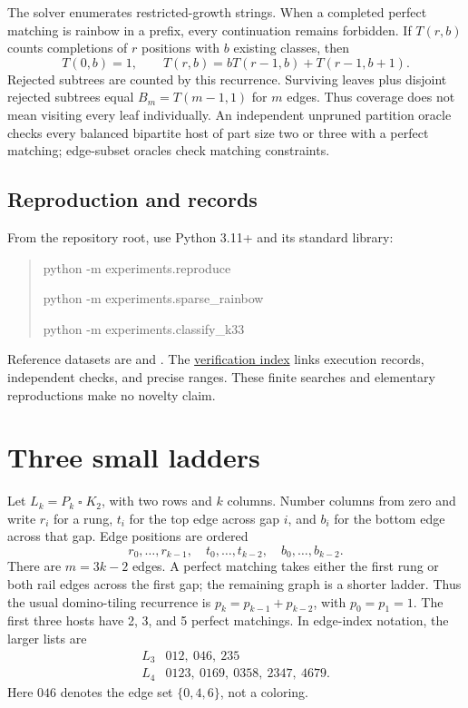 \documentclass[11pt,letterpaper]{article}
\begin{document}
The solver enumerates restricted-growth strings. When a completed perfect
matching is rainbow in a prefix, every continuation remains forbidden.
If $T(r,b)$ counts completions of $r$ positions with $b$ existing classes, then
\[
 T(0,b)=1,\qquad T(r,b)=bT(r-1,b)+T(r-1,b+1).
\]
Rejected subtrees are counted by this recurrence. Surviving leaves plus
disjoint rejected subtrees equal $B_m=T(m-1,1)$ for $m$ edges. Thus coverage
does not mean visiting every leaf individually. An independent unpruned
partition oracle checks every balanced bipartite host of part size two or
three with a perfect matching; edge-subset oracles check matching constraints.

\subsection*{Reproduction and records}
From the repository root, use Python 3.11+ and its standard library:
\begin{quote}\small\ttfamily
python -m experiments.reproduce\par
python -m experiments.sparse\_rainbow\par
python -m experiments.classify\_k33
\end{quote}
Reference datasets are  and
. The
\href{https://github.com/Akhil-rav/discrete-math-lab/blob/main/results/verification_index.md}{verification index}
links execution records, independent checks, and precise ranges. These
finite searches and elementary reproductions make no novelty claim.

\newpage
\section{Three small ladders}
Let $L_k=P_k\mathbin{\square}K_2$, with two rows and $k$ columns. Number columns
from zero and write $r_i$ for a rung, $t_i$ for the top edge across gap $i$,
and $b_i$ for the bottom edge across that gap. Edge positions are ordered
\[
 r_0,\ldots,r_{k-1},\quad
 t_0,\ldots,t_{k-2},\quad b_0,\ldots,b_{k-2}.
\]
There are $m=3k-2$ edges. A perfect matching takes either the first rung
or both rail edges across the first gap; the remaining graph is a shorter
ladder. Thus the usual domino-tiling recurrence is
$p_k=p_{k-1}+p_{k-2}$, with $p_0=p_1=1$. The first three hosts have
2, 3, and 5 perfect matchings. In edge-index notation, the larger lists are
\[
\begin{array}{c|l}
 L_3 & 012,\ 046,\ 235\\
 L_4 & 0123,\ 0169,\ 0358,\ 2347,\ 4679 .
\end{array}
\]
Here $046$ denotes the edge set $\{0,4,6\}$, not a coloring.
\end{document}
